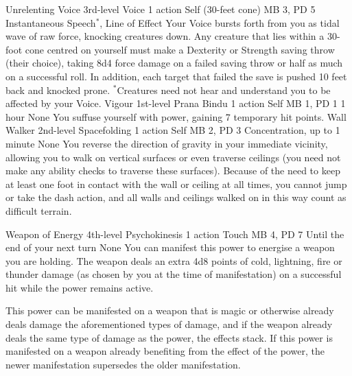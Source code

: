 \DndPowerHeader%
    {Unrelenting Voice\label{pwr:unrelenting-voice}}
    {3rd-level Voice}
    {1 action}
    {Self (30-feet cone)}
    {MB 3, PD 5}
    {Instantaneous}
    {Speech$^*$, Line of Effect}
Your Voice bursts forth from you as tidal
wave of raw force, knocking creatures down. Any creature that
lies within a 30-foot cone centred on yourself must make a
Dexterity or Strength saving throw (their choice), taking
8d4 force damage on a failed saving throw or half as much
on a successful roll. In addition, each target that failed
the save is pushed 10 feet back and knocked prone.
$^*$Creatures need not hear and understand you to be
affected by your Voice.
\DndPowerHeader%
    {Vigour\label{pwr:vigour}}
    {1st-level Prana Bindu}
    {1 action}
    {Self}
    {MB 1, PD 1}
    {1 hour}
    {None}
You suffuse yourself with power, gaining
7 temporary hit points.
\DndPowerHeader%
    {Wall Walker\label{pwr:wall-walker}}
    {2nd-level Spacefolding}
    {1 action}
    {Self}
    {MB 2, PD 3}
    {Concentration, up to 1 minute}
    {None}
You reverse the direction of gravity in your
immediate vicinity, allowing you to walk on vertical surfaces
or even traverse ceilings (you need not make any ability checks
to traverse these surfaces). Because of the need to keep at
least one foot in contact with the wall or ceiling at all
times, you cannot jump or take the dash action, and all walls
and ceilings walked on in this way count as difficult terrain.

\DndPowerHeader%
    {Weapon of Energy\label{pwr:weapon-of-energy}}
    {4th-level Psychokinesis}
    {1 action}
    {Touch}
    {MB 4, PD 7}
    {Until the end of your next turn}
    {None}
You can manifest this power to energise a
weapon you are holding. The weapon deals an extra 4d8 points
of cold, lightning, fire or thunder damage (as chosen by you
at the time of manifestation) on a successful hit
while the power remains active.

This power can be manifested on a weapon that is magic or
otherwise already deals damage the aforementioned types of
damage, and if the weapon already deals the same type of damage
as the power, the effects stack. If this power is manifested
on a weapon already benefiting from the effect of the power,
the newer manifestation supersedes the older manifestation.

